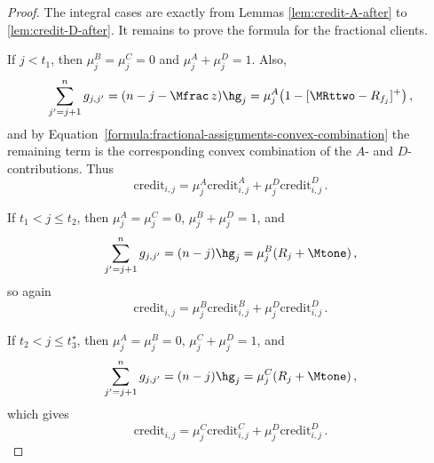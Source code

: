 \begin{proof}
    The integral cases are exactly from Lemmas \ref{lem:credit-A-after} to \ref{lem:credit-D-after}. It remains to prove the formula for the fractional clients.

    If $j<t_1$, then $\mu_j^B=\mu_j^C=0$ and $\mu_j^A+\mu_j^D=1$. Also,
    \begin{equation*}
        \sum_{j'=j+1}^{n} g_{j,j'}=(n-j-\Mfrac\, z)\hg_j=
        \mu_j^A\bigl(1-[\MRttwo-R_{f_j}]^+\bigr)\,,
    \end{equation*}
    and by Equation~\ref{formula:fractional-assignments-convex-combination} the remaining term is the corresponding convex combination of the $A$- and $D$-contributions. Thus
    \begin{equation*}
        \text{credit}_{i,j}=
        \mu_j^A\text{credit}_{i,j}^A+
        \mu_j^D\text{credit}_{i,j}^D\,.
    \end{equation*}

    If $t_1<j\le t_2$, then $\mu_j^A=\mu_j^C=0$, $\mu_j^B+\mu_j^D=1$, and
    \begin{equation*}
        \sum_{j'=j+1}^{n} g_{j,j'}=(n-j)\hg_j=
        \mu_j^B(R_j+\Mtone)\,,
    \end{equation*}
    so again
    \begin{equation*}
        \text{credit}_{i,j}=
        \mu_j^B\text{credit}_{i,j}^B+
        \mu_j^D\text{credit}_{i,j}^D\,.
    \end{equation*}

    If $t_2<j\le t_3^\star$, then $\mu_j^A=\mu_j^B=0$, $\mu_j^C+\mu_j^D=1$, and
    \begin{equation*}
        \sum_{j'=j+1}^{n} g_{j,j'}=(n-j)\hg_j=
        \mu_j^C(R_j+\Mtone)\,,
    \end{equation*}
    which gives
    \begin{equation*}
        \text{credit}_{i,j}=
        \mu_j^C\text{credit}_{i,j}^C+
        \mu_j^D\text{credit}_{i,j}^D\,.
    \end{equation*}


\end{proof}
